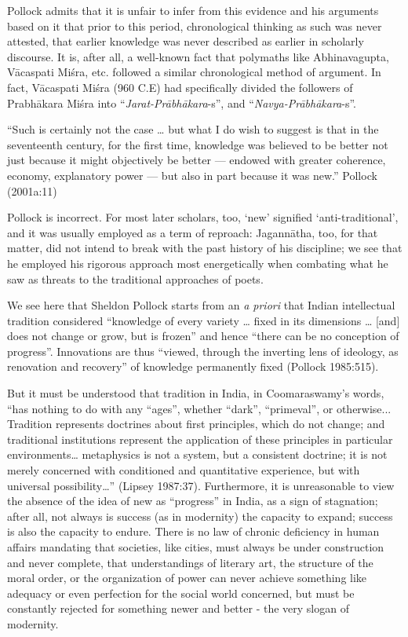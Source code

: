 Pollock admits that it is unfair to infer from this evidence and his arguments based on it that prior to this period, chronological thinking as such was never attested, that earlier knowledge was never described as earlier in scholarly discourse. It is, after all, a well-known fact that polymaths like Abhinavagupta, Vācaspati Miśra, etc. followed a similar chronological method of argument. In fact, Vācaspati Miśra (960 C.E) had specifically divided the followers of Prabhākara Miśra into “{\sl Jarat-Prābhākara}-s”, and “{\sl Navya-Prābhākara}-s”.  
\begin{myquote}
“Such is certainly not the case … but what I do wish to suggest is that in the seventeenth century, for the first time, knowledge was believed to be better not just because it might objectively be better — endowed with greater coherence, economy, explanatory power — but also in part because it was new.”  \hfill{Pollock (2001a:11)}
\end{myquote}

Pollock is incorrect. For most later scholars, too, ‘new’ signified ‘anti-traditional’, and it was usually employed as a term of reproach: Jagannātha, too, for that matter, did not intend to break with the past history of his discipline; we see that he employed his rigorous approach most energetically when combating what he saw as threats to the traditional approaches of poets.

We see here that Sheldon Pollock starts from an {\sl a priori} that Indian intellectual tradition considered “knowledge of every variety … fixed in its dimensions … [and] does not change or grow, but is frozen” and hence “there can be no conception of progress”. Innovations are thus “viewed, through the inverting lens of ideology, as renovation and recovery” of knowledge permanently fixed (Pollock 1985:515).  

But it must be understood that tradition in India, in Coomaraswamy’s words, “has nothing to do with any “ages”, whether “dark”, “primeval”, or otherwise... Tradition represents doctrines about first principles, which do not change; and traditional institutions represent the application of these principles in particular environments… metaphysics is not a system, but a consistent doctrine; it is not merely concerned with conditioned and quantitative experience, but with universal possibility…” (Lipsey 1987:37). Furthermore, it is unreasonable to view the absence of the idea of new as “progress” in India, as a sign of stagnation; after all, not always is success (as in modernity) the capacity to expand; success is also the capacity to endure. There is no law of chronic deficiency in human affairs mandating that societies, like cities, must always be under construction and never complete, that understandings of literary art, the structure of the moral order, or the organization of power can never achieve something like adequacy or even perfection for the social world concerned, but must be constantly rejected for something newer and better - the very slogan of modernity.  

